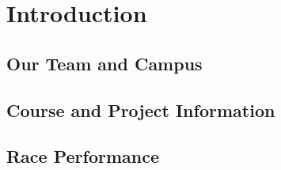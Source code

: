 \section{Introduction}

\subsection{Our Team and Campus}

\subsection{Course and Project Information}

\subsection{Race Performance}
